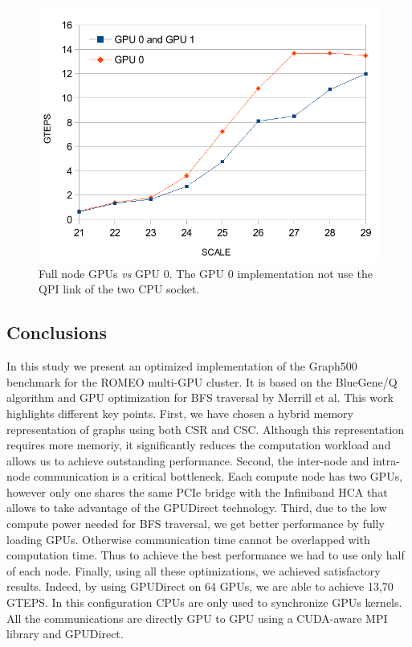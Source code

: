 \begin{figure}[!t]
\centering
\includegraphics[width=.8\columnwidth]{figures/graph500/full_vs_gpu0}
\caption[]{Full node GPUs \textit{vs} GPU 0. The GPU 0 implementation not use the QPI link of the two CPU socket.}
\label{fig:full_vs_gpu0}
\end{figure}

\subsection{Conclusions}
In this study we present an optimized implementation of the Graph500 benchmark for the ROMEO  multi-GPU cluster. It is based on the BlueGene/Q algorithm and GPU optimization for BFS traversal by Merrill et al. 
This work highlights different key points.
First, we have chosen a hybrid memory representation of graphs using both CSR and CSC. %
Although this representation requires more memoriy, it significantly reduces  the computation workload and allows us to achieve outstanding performance.
Second, the inter-node and intra-node communication is a critical bottleneck. 
Each compute node has two GPUs, however only one shares the same PCIe bridge with the Infiniband HCA that allows to take advantage of the GPUDirect technology.
Third, due to the low compute power needed for BFS traversal, we get better performance by fully loading GPUs.
Otherwise communication time cannot be overlapped with computation time. 
Thus to achieve the best performance we had to use only half of each node.
Finally, using all these optimizations, we achieved satisfactory results. 
Indeed, by using GPUDirect on 64 GPUs,  we are able to achieve 13,70 GTEPS. 
In this configuration CPUs are only used to synchronize GPUs kernels. 
All the communications are directly GPU to GPU using a CUDA-aware MPI library and GPUDirect.

